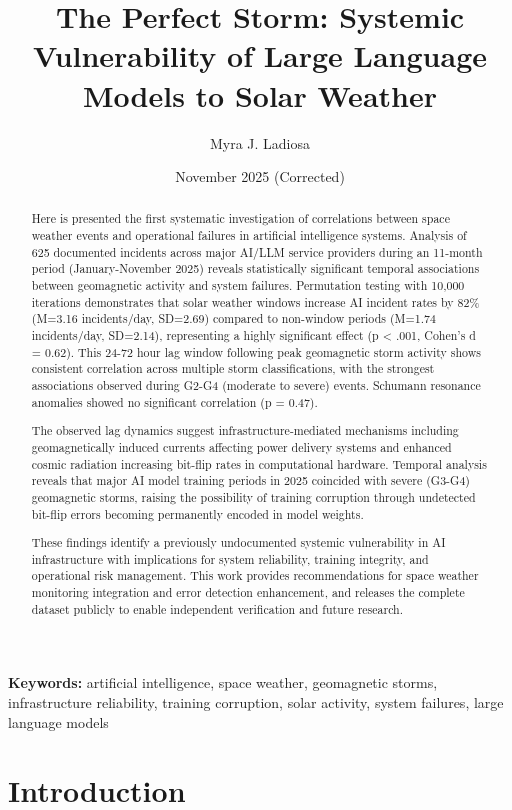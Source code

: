 \documentclass[11pt,a4paper]{article}
\title{The Perfect Storm: Systemic Vulnerability of Large Language Models to Solar Weather}
\author{Myra J. Ladiosa}
\date{November 2025 (Corrected)}
\begin{document}
\maketitle

\begin{abstract}
Here is presented the first systematic investigation of correlations between space weather events and operational failures in artificial intelligence systems. Analysis of 625 documented incidents across major AI/LLM service providers during an 11-month period (January-November 2025) reveals statistically significant temporal associations between geomagnetic activity and system failures. Permutation testing with 10,000 iterations demonstrates that solar weather windows increase AI incident rates by 82\% (M=3.16 incidents/day, SD=2.69) compared to non-window periods (M=1.74 incidents/day, SD=2.14), representing a highly significant effect (p < .001, Cohen's d = 0.62). This 24-72 hour lag window following peak geomagnetic storm activity shows consistent correlation across multiple storm classifications, with the strongest associations observed during G2-G4 (moderate to severe) events. Schumann resonance anomalies showed no significant correlation (p = 0.47).

The observed lag dynamics suggest infrastructure-mediated mechanisms including geomagnetically induced currents affecting power delivery systems and enhanced cosmic radiation increasing bit-flip rates in computational hardware. Temporal analysis reveals that major AI model training periods in 2025 coincided with severe (G3-G4) geomagnetic storms, raising the possibility of training corruption through undetected bit-flip errors becoming permanently encoded in model weights.

These findings identify a previously undocumented systemic vulnerability in AI infrastructure with implications for system reliability, training integrity, and operational risk management. This work provides recommendations for space weather monitoring integration and error detection enhancement, and releases the complete dataset publicly to enable independent verification and future research.
\end{abstract}

\noindent\textbf{Keywords:} artificial intelligence, space weather, geomagnetic storms, infrastructure reliability, training corruption, solar activity, system failures, large language models

\section{Introduction}
\end{document}
